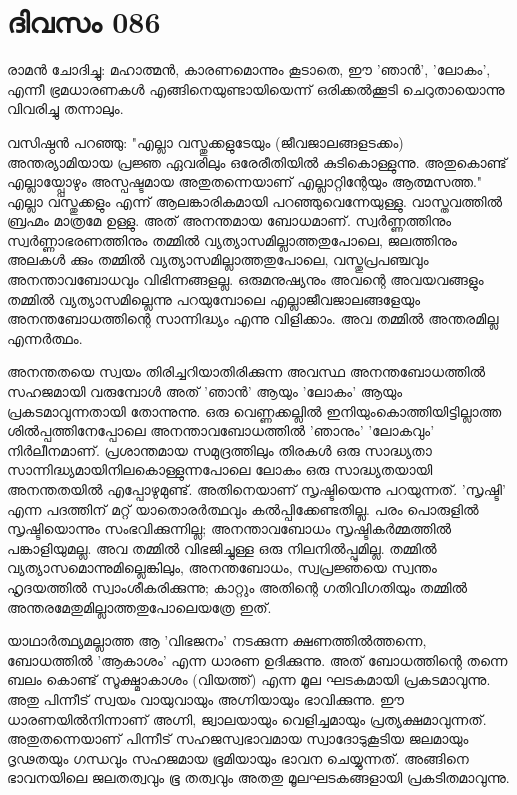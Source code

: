  
\section{ദിവസം 086}


രാമന്‍ ചോദിച്ചു: മഹാത്മന്‍, കാരണമൊന്നും കൂടാതെ, ഈ 'ഞാന്‍', 'ലോകം', എന്നീ ഭ്രമധാരണകള്‍ എങ്ങിനെയുണ്ടായിയെന്ന് ഒരിക്കല്‍ക്കൂടി ചെറുതായൊന്നു വിവരിച്ചു തന്നാലും.

വസിഷ്ഠന്‍ പറഞ്ഞു: "എല്ലാ വസ്തുക്കളുടേയും (ജീവജാലങ്ങളടക്കം) അന്തര്യാമിയായ പ്രജ്ഞ ഏവരിലും ഒരേരീതിയില്‍ കുടികൊള്ളുന്നു. അതുകൊണ്ട്‌ എല്ലായ്പ്പോഴും അസ്പഷ്ടമായ അതുതന്നെയാണ്‌ എല്ലാറ്റിന്റേയും ആത്മസത്ത." എല്ലാ വസ്തുക്കളും എന്ന് ആലങ്കാരികമായി പറഞ്ഞുവെന്നേയുള്ളു. വാസ്തവത്തില്‍ ബ്രഹ്മം മാത്രമേ ഉള്ളു. അത്‌ അനന്തമായ ബോധമാണ്‌. സ്വര്‍ണ്ണത്തിനും സ്വര്‍ണ്ണാഭരണത്തിനും തമ്മില്‍ വ്യത്യാസമില്ലാത്തതുപോലെ, ജലത്തിനും അലകള്‍ ക്കും തമ്മില്‍ വ്യത്യാസമില്ലാത്തതുപോലെ, വസ്തുപ്രപഞ്ചവും അനന്താവബോധവും വിഭിന്നങ്ങളല്ല. ഒരുമനുഷ്യനും അവന്റെ അവയവങ്ങളും തമ്മില്‍ വ്യത്യാസമില്ലെന്നു പറയുമ്പോലെ എല്ലാജീവജാലങ്ങളേയും അനന്തബോധത്തിന്റെ സാന്നിദ്ധ്യം എന്നു വിളിക്കാം. അവ തമ്മില്‍ അന്തരമില്ല എന്നര്‍ത്ഥം. 

അനന്തതയെ സ്വയം തിരിച്ചറിയാതിരിക്കുന്ന അവസ്ഥ അനന്തബോധത്തില്‍ സഹജമായി വരുമ്പോള്‍ അത്‌ 'ഞാന്‍' ആയും 'ലോകം' ആയും പ്രകടമാവുന്നതായി തോന്നുന്നു. ഒരു വെണ്ണക്കല്ലില്‍ ഇനിയുംകൊത്തിയിട്ടില്ലാത്ത ശില്‍പ്പത്തിനേപ്പോലെ അനന്താവബോധത്തില്‍ 'ഞാനും' 'ലോകവും' നിര്‍ലീനമാണ്‌. പ്രശാന്തമായ സമുദ്രത്തിലും തിരകള്‍ ഒരു സാദ്ധ്യതാ സാന്നിദ്ധ്യമായിനിലകൊള്ളുന്നപോലെ ലോകം ഒരു സാദ്ധ്യതയായി അനന്തതയില്‍ എപ്പോഴുമുണ്ട്‌. അതിനെയാണ്‌ സൃഷ്ടിയെന്നു പറയുന്നത്‌. 'സൃഷ്ടി' എന്ന പദത്തിന്‌ മറ്റ്‌ യാതൊരര്‍ത്ഥവും കല്‍പ്പിക്കേണ്ടതില്ല. പരം പൊരുളില്‍ സൃഷ്ടിയൊന്നും സംഭവിക്കുന്നില്ല; അനന്താവബോധം സൃഷ്ടികര്‍മ്മത്തില്‍ പങ്കാളിയുമല്ല. അവ തമ്മില്‍ വിഭജിച്ചുള്ള ഒരു നിലനില്‍പ്പുമില്ല. തമ്മില്‍ വ്യത്യാസമൊന്നുമില്ലെങ്കിലും, അനന്തബോധം, സ്വപ്രജ്ഞയെ സ്വന്തം ഹൃദയത്തില്‍ സ്വാംശീകരിക്കുന്നു; കാറ്റും അതിന്റെ ഗതിവിഗതിയും തമ്മില്‍ അന്തരമേതുമില്ലാത്തതുപോലെയത്രേ ഇത്‌. 

യാഥാര്‍ത്ഥ്യമല്ലാത്ത ആ 'വിഭജനം' നടക്കുന്ന ക്ഷണത്തില്‍ത്തന്നെ, ബോധത്തില്‍ 'ആകാശം' എന്ന ധാരണ ഉദിക്കുന്നു. അത്‌ ബോധത്തിന്റെ തന്നെ ബലം കൊണ്ട്‌ സൂക്ഷ്മാകാശം (വിയത്ത്‌) എന്ന മൂല ഘടകമായി പ്രകടമാവുന്നു. അതു പിന്നീട്‌ സ്വയം വായുവായും അഗ്നിയായും ഭാവിക്കുന്നു. ഈ ധാരണയില്‍നിന്നാണ്‌ അഗ്നി, ജ്വാലയായും വെളിച്ചമായും പ്രത്യക്ഷമാവുന്നത്‌. അതുതന്നെയാണ്‌ പിന്നീട്‌ സഹജസ്വഭാവമായ സ്വാദോടുകൂടിയ ജലമായും ദൃഢതയും ഗന്ധവും സഹജമായ ഭൂമിയായും ഭാവന ചെയ്യുന്നത്‌. അങ്ങിനെ ഭാവനയിലെ ജലതത്വവും ഭൂ തത്വവും അതതു മൂലഘടകങ്ങളായി പ്രകടിതമാവുന്നു.

